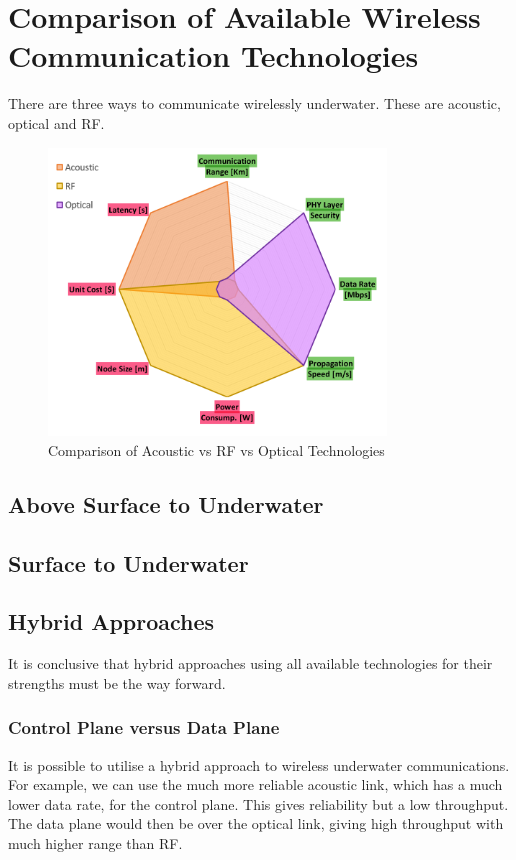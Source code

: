 \section{Comparison of Available Wireless Communication Technologies}

There are three ways to communicate wirelessly underwater. These are
acoustic, optical and \ac{RF}.

\begin{figure}[H]
  \includegraphics[width=0.8\textwidth]{acoustic_rf_optical_comparison.png}
  \caption{Comparison of Acoustic vs RF vs Optical Technologies}
  \label{fig:acoustic_rf_optical_comparison}
\end{figure}

\subsection{Above Surface to Underwater}

\subsection{Surface to Underwater}

\subsection{Hybrid Approaches}
It is conclusive that hybrid approaches using all available technologies
for their strengths must be the way forward.


\subsubsection{Control Plane versus Data Plane}
It is possible to utilise a hybrid approach to wireless underwater
communications. For example, we can use the much more reliable
acoustic link, which has a much lower data rate, for the control
plane. This gives reliability but a low throughput. The data plane
would then be over the optical link, giving high throughput with
much higher range than \ac{RF}.